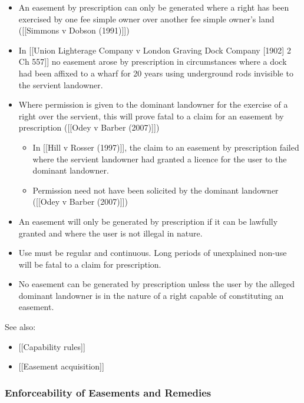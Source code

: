 \documentclass[
]{article}
\providecommand{\tightlist}{%
  \setlength{\itemsep}{0pt}\setlength{\parskip}{0pt}}
\begin{document}
\begin{itemize}
\tightlist
\item
  An easement by prescription can only be generated where a right has
  been exercised by one fee simple owner over another fee simple owner's
  land ({[}{[}Simmons v Dobson (1991){]}{]})
\item
  In {[}{[}Union Lighterage Company v London Graving Dock Company
  {[}1902{]} 2 Ch 557{]}{]} no easement arose by prescription in
  circumstances where a dock had been affixed to a wharf for 20 years
  using underground rods invisible to the servient landowner.
\item
  Where permission is given to the dominant landowner for the exercise
  of a right over the servient, this will prove fatal to a claim for an
  easement by prescription ({[}{[}Odey v Barber (2007){]}{]})

  \begin{itemize}
  \tightlist
  \item
    In {[}{[}Hill v Rosser (1997){]}{]}, the claim to an easement by
    prescription failed where the servient landowner had granted a
    licence for the user to the dominant landowner.
  \item
    Permission need not have been solicited by the dominant landowner
    ({[}{[}Odey v Barber (2007){]}{]})
  \end{itemize}
\item
  An easement will only be generated by prescription if it can be
  lawfully granted and where the user is not illegal in nature.
\item
  Use must be regular and continuous. Long periods of unexplained
  non-use will be fatal to a claim for prescription.
\item
  No easement can be generated by prescription unless the user by the
  alleged dominant landowner is in the nature of a right capable of
  constituting an easement.
\end{itemize}

See also:

\begin{itemize}
\tightlist
\item
  {[}{[}Capability rules{]}{]}
\item
  {[}{[}Easement acquisition{]}{]}
\end{itemize}

\hypertarget{enforceability-of-easements-and-remedies}{%
\subsubsection{Enforceability of Easements and
Remedies}\label{enforceability-of-easements-and-remedies}}
\end{document}
